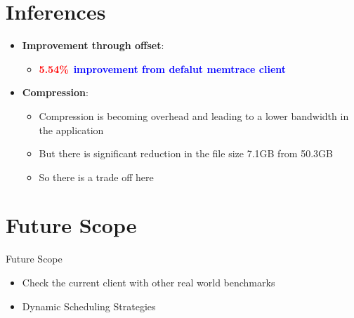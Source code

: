 \documentclass[aspectratio=169]{beamer}
\begin{document}
\section{Inferences}
\begin{frame}
    \begin{itemize}
        \item \textbf{Improvement through offset}:
    \begin{itemize}
        \item {\textcolor{blue}\quad \textcolor{red}{\Large\textbf{5.54\%}}~\textcolor{blue}{\textbf{improvement from defalut memtrace client}}}
    \end{itemize}
        \item \textbf{Compression}:
        \begin{itemize}
            \item Compression is becoming overhead and leading to a lower bandwidth in the application
            \item But there is significant reduction in the file size 7.1GB from 50.3GB
            \item So there is a trade off here
        \end{itemize}
\end{itemize}
\end{frame}

\section{Future Scope}
\begin{frame}{Future Scope}
    \begin{itemize}
        \item Check the current client with other real world benchmarks
        \item Dynamic Scheduling Strategies
    \end{itemize}
\end{frame}
\end{document}
